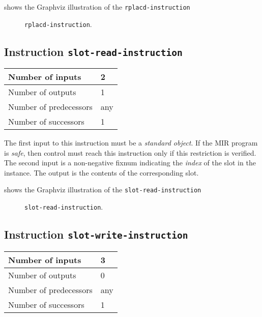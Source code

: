  shows the Graphviz illustration of the
\texttt{rplacd-instruction}

\begin{figure}
\begin{center}
\end{center}
\caption{\label{fig-rplacd-instruction}
\texttt{rplacd-instruction}.}
\end{figure}

\subsection{Instruction \texttt{slot-read-instruction}}
\label{mir-instruction-slot-read}

\begin{tabular}{|l|l|}
\hline
Number of inputs & 2\\
\hline
Number of outputs & 1\\
\hline
Number of predecessors & any\\
\hline
Number of successors & 1\\
\hline
\end{tabular}

The first input to this instruction must be a \emph{standard object}.
If the MIR program is \emph{safe}, then control must reach this
instruction only if this restriction is verified.  The second input is
a non-negative fixnum indicating the \emph{index} of the slot in the
instance.  The output is the contents of the corresponding slot.

 shows the Graphviz illustration of the
\texttt{slot-read-instruction}

\begin{figure}
\begin{center}
\end{center}
\caption{\label{fig-slot-read-instruction}
\texttt{slot-read-instruction}.}
\end{figure}

\subsection{Instruction \texttt{slot-write-instruction}}
\label{mir-instruction-slot-write}

\begin{tabular}{|l|l|}
\hline
Number of inputs & 3\\
\hline
Number of outputs & 0\\
\hline
Number of predecessors & any\\
\hline
Number of successors & 1\\
\hline
\end{tabular}

